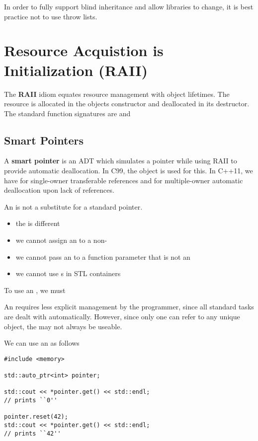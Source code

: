 \documentclass[12pt]{article}
\begin{document}
In order to fully support blind inheritance and allow libraries to change, it is best practice not to use throw lists.

\section{Resource Acquistion is Initialization (RAII)}
The {\bf RAII} idiom equates resource management with object lifetimes. The resource is allocated in the objects constructor and deallocated in its destructor. The standard function signatures are  and 

\subsection{Smart Pointers}
A {\bf smart pointer} is an ADT which simulates a pointer while using RAII to provide automatic deallocation. In C99, the  object is used for this. In C++11, we have  for single-owner transferable references and  for multiple-owner automatic deallocation upon lack of references.

An  is not a substitute for a standard pointer.
\begin{itemize}
\item the  is different
\item we cannot assign an  to a non-
\item we cannot pass an  to a function parameter that is not an 
\item we cannot use s in STL containers
\end{itemize}

To use an , we must 

An  requires less explicit management by the programmer, since all standard tasks are dealt with automatically. However, since only one  can refer to any unique object, the  may not always be useable.

We can use an  as follows
\begin{verbatim}
#include <memory>

std::auto_ptr<int> pointer;

std::cout << *pointer.get() << std::endl;
// prints ``0''

pointer.reset(42);
std::cout << *pointer.get() << std::endl;
// prints ``42''
\end{verbatim}
\end{document}
